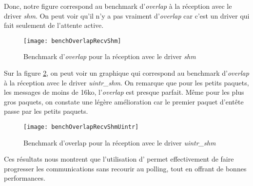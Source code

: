Donc, notre figure correspond au benchmark d'\emph{overlap} à la réception avec le driver \emph{shm}.
On peut voir qu'il n'y a pas vraiment d'\emph{overlap} car c'est un driver qui fait seulement de l'attente active.

\begin{figure}[H]
  \texttt{[image: benchOverlapRecvShm]}
  \caption{Benchmark d'\emph{overlap} pour la réception avec le driver \emph{shm}}
  \label{fig:benchOverlapRecvShm}
\end{figure}

Sur la figure \ref{fig:benchOverlapRecvShmUintr}, on peut voir un graphique qui correspond au benchmark d'\emph{overlap} à la réception avec le driver \emph{uintr_shm}.
On remarque que pour les petits paquets, les messages de moins de 16ko, l'\emph{overlap} est presque parfait.
Même pour les plus gros paquets, on constate une légère amélioration car le premier paquet d'entête passe par les petits paquets.
\begin{figure}[H]
  \texttt{[image: benchOverlapRecvShmUintr]}
  \caption{Benchmark d'overlap pour la réception avec le driver \emph{uintr_shm}}
  \label{fig:benchOverlapRecvShmUintr}
\end{figure}


Ces résultats nous montrent que l'utilisation d'\uintr{} permet effectivement de faire progresser les communications sans recourir au polling,
tout en offrant de bonnes performances.
